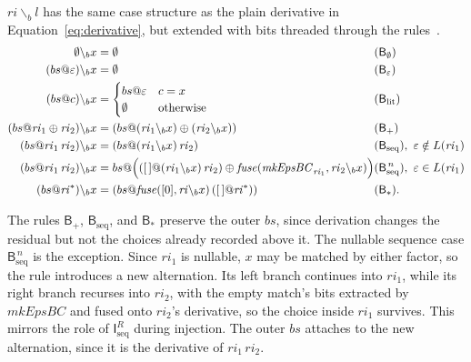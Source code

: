 $\mathit{ri}\backslash_b l$ has the same case structure 
as the plain derivative in Equation~\eqref{eq:derivative}, 
but extended with bits threaded through the rules~\citep[Fig.~5]{sulzmannlu2014}.
\begin{equation}\label{eq:bderiv}
\begin{aligned}
\emptyset \backslash_b x &= \emptyset
  &&\hspace{-1em}(\mathsf{B}_{\emptyset}) \\
(bs@\varepsilon) \backslash_b x &= \emptyset
  &&\hspace{-1em}(\mathsf{B}_{\varepsilon}) \\
(bs@c) \backslash_b x &=
  \begin{cases}
    bs@\varepsilon & c = x \\
    \emptyset & \text{otherwise}
  \end{cases}
  &&\hspace{-1em}(\mathsf{B}_{\mathrm{lit}}) \\
(bs@\mathit{ri}_1 \oplus \mathit{ri}_2) \backslash_b x &=
  (bs@(\mathit{ri}_1 \backslash_b x) \oplus (\mathit{ri}_2 \backslash_b x))
  &&\hspace{-1em}(\mathsf{B}_{+}) \\
(bs@\mathit{ri}_1\,\mathit{ri}_2) \backslash_b x &=
  (bs@(\mathit{ri}_1 \backslash_b x)\,\mathit{ri}_2)
  &&\hspace{-1em}(\mathsf{B}_{\mathrm{seq}}),\ \varepsilon \notin L(\mathit{ri}_1) \\
(bs@\mathit{ri}_1\,\mathit{ri}_2) \backslash_b x &=
  bs@\Big(
    ([\,]@(\mathit{ri}_1 \backslash_b x)\,\mathit{ri}_2)
    \oplus
    \mathit{fuse}(\mathit{mkEpsBC}_{\mathit{ri}_1},
                   \mathit{ri}_2 \backslash_b x)
  \Big)
  &&\hspace{-1em}(\mathsf{B}_{\mathrm{seq}}^{\,n}),\ \varepsilon \in L(\mathit{ri}_1) \\
(bs@\mathit{ri}^{*}) \backslash_b x &=
  (bs@\mathit{fuse}([0],\mathit{ri} \backslash_b x)\,
  ([\,]@\mathit{ri}^{*}))
  &&\hspace{-1em}(\mathsf{B}_{*}).
\end{aligned}
\end{equation}

The rules $\mathsf{B}_{+}$, $\mathsf{B}_{\mathrm{seq}}$, 
and $\mathsf{B}_{*}$ preserve the outer $bs$, 
since derivation changes the residual but not the choices already recorded above it. 
The nullable sequence case $\mathsf{B}_{\mathrm{seq}}^{\,n}$ is the exception. 
Since $\mathit{ri}_1$ is nullable, $x$ may be matched by either factor, 
so the rule introduces a new alternation. 
Its left branch continues into $\mathit{ri}_1$, 
while its right branch recurses into $\mathit{ri}_2$, 
with the empty match's bits extracted by $\mathit{mkEpsBC}$ 
and fused onto $\mathit{ri}_2$'s derivative, 
so the choice inside $\mathit{ri}_1$ survives. 
This mirrors the role of $\mathsf{I}_{\mathrm{seq}}^{R}$ during injection.
The outer $bs$ attaches to the new alternation,
since it is the derivative of $\mathit{ri}_1\,\mathit{ri}_2$.

